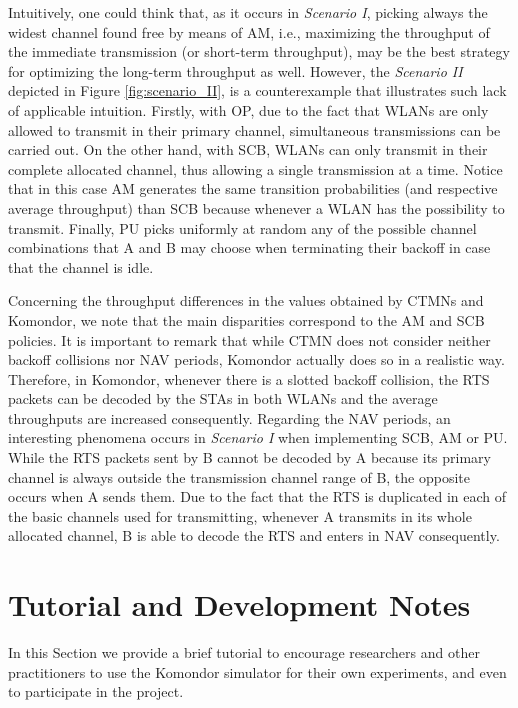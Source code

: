 \documentclass[a4paper]{article}
\begin{document}
	Intuitively, one could think that, as it occurs in \textit{Scenario I}, picking always the widest channel found free by means of AM, i.e., maximizing the throughput of the immediate transmission (or short-term throughput), may be the best strategy for optimizing the long-term throughput as well. However, the \textit{Scenario II} depicted in Figure \ref{fig:scenario_II}, is a counterexample that illustrates such lack of applicable intuition. Firstly, with OP, due to the fact that WLANs are only allowed to transmit in their primary channel, simultaneous transmissions can be carried out. On the other hand, with SCB, WLANs can only transmit in their complete allocated channel, thus allowing a single transmission at a time. Notice that in this case AM generates the same transition probabilities (and respective average throughput) than SCB because whenever a WLAN has the possibility to transmit. Finally, PU picks uniformly at random any of the possible channel combinations that A and B may choose when terminating their backoff in case that the channel is idle.
			
	Concerning the throughput differences in the values obtained by CTMNs and Komondor, we note that the main disparities correspond to the AM and SCB policies. It is important to remark that while CTMN does not consider neither backoff collisions nor NAV periods, Komondor actually does so in a realistic way. Therefore, in Komondor, whenever there is a slotted backoff collision, the RTS packets can be decoded by the STAs in both WLANs and the average throughputs are increased consequently.	
	Regarding the NAV periods, an interesting phenomena occurs in \textit{Scenario I} when implementing SCB, AM or PU. While the RTS packets sent by B cannot be decoded by A because its primary channel is always outside the transmission channel range of B, the opposite occurs when A sends them. Due to the fact that the RTS is duplicated in each of the basic channels used for transmitting, whenever A transmits in its whole allocated channel, B is able to decode the RTS and enters in NAV consequently. 

\section{Tutorial and Development Notes}
\label{section:tutorial_and_development_notes}
	In this Section we provide a brief tutorial to encourage researchers and other practitioners to use the Komondor simulator for their own experiments, and even to participate in the project. 
\end{document}

